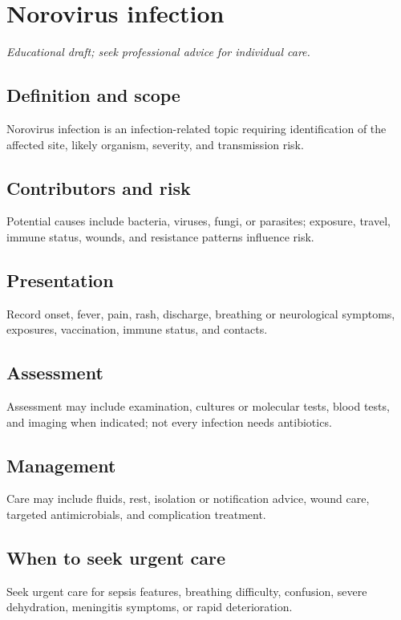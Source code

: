 \chapter{Norovirus infection}

\medskip
\noindent\textit{Educational draft; seek professional advice for individual care.}

\section*{Definition and scope}
Norovirus infection is an infection-related topic requiring identification of the affected site, likely organism, severity, and transmission risk.

\section*{Contributors and risk}
Potential causes include bacteria, viruses, fungi, or parasites; exposure, travel, immune status, wounds, and resistance patterns influence risk.

\section*{Presentation}
Record onset, fever, pain, rash, discharge, breathing or neurological symptoms, exposures, vaccination, immune status, and contacts.

\section*{Assessment}
Assessment may include examination, cultures or molecular tests, blood tests, and imaging when indicated; not every infection needs antibiotics.

\section*{Management}
Care may include fluids, rest, isolation or notification advice, wound care, targeted antimicrobials, and complication treatment.

\section*{When to seek urgent care}
Seek urgent care for sepsis features, breathing difficulty, confusion, severe dehydration, meningitis symptoms, or rapid deterioration.

